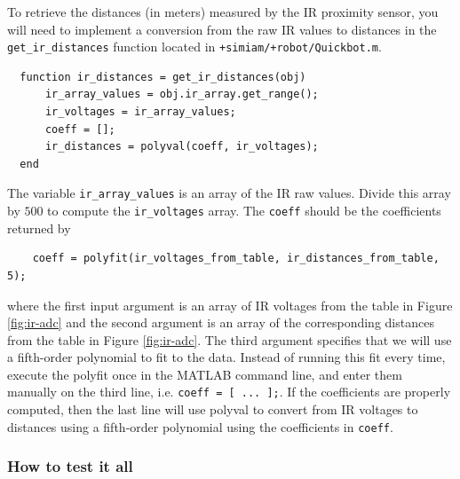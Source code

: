 \documentclass[10pt]{article}
\begin{document}
\begin{enumerate}
 To retrieve the distances (in meters) measured by the IR proximity sensor, you will need to implement a conversion from the raw IR values to distances in the \texttt{get\_ir\_distances} function located in \texttt{+simiam/+robot/Quickbot.m}.
 \begin{verbatim}
  function ir_distances = get_ir_distances(obj)
      ir_array_values = obj.ir_array.get_range();
      ir_voltages = ir_array_values;
      coeff = [];
      ir_distances = polyval(coeff, ir_voltages);
  end\end{verbatim}
  The variable \texttt{ir\_array\_values} is an array of the IR raw values. Divide this array by $500$ to compute the \texttt{ir\_voltages} array. The \texttt{coeff} should be the coefficients returned by
  \begin{verbatim}
    coeff = polyfit(ir_voltages_from_table, ir_distances_from_table, 5);\end{verbatim}
where the first input argument is an array of IR voltages from the table in Figure \ref{fig:ir-adc} and the second argument is an array of the corresponding distances from the table in Figure \ref{fig:ir-adc}. The third argument specifies that we will use a fifth-order polynomial to fit to the data. Instead of running this fit every time, execute the polyfit once in the MATLAB command line, and enter them manually on the third line, i.e. \texttt{coeff = [ ... ];}. If the coefficients are properly computed, then the last line will use polyval to convert from IR voltages to distances using a fifth-order polynomial using the coefficients in \texttt{coeff}. 
 
\end{enumerate}

\subsubsection*{How to test it all}
\end{document}
